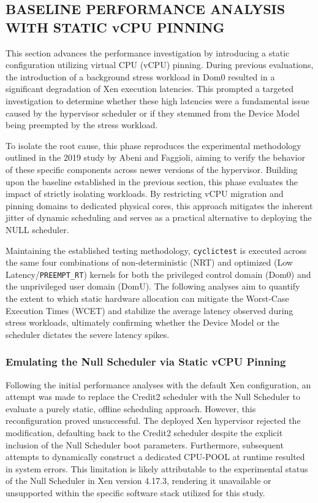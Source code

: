 \subsection{BASELINE PERFORMANCE ANALYSIS WITH STATIC vCPU
PINNING}\label{baseline-performance-analysis-with-static-vcpu-pinning}

This section advances the performance investigation by introducing a
static configuration utilizing virtual CPU (vCPU) pinning. During
previous evaluations, the introduction of a background stress workload
in Dom0 resulted in a significant degradation of Xen execution
latencies. This prompted a targeted investigation to determine whether
these high latencies were a fundamental issue caused by the hypervisor
scheduler or if they stemmed from the Device Model being preempted by
the stress workload.

To isolate the root cause, this phase reproduces the experimental
methodology outlined in the 2019 study by Abeni and Faggioli, aiming to
verify the behavior of these specific components across newer versions
of the hypervisor. Building upon the baseline established in the
previous section, this phase evaluates the impact of strictly isolating
workloads. By restricting vCPU migration and pinning domains to
dedicated physical cores, this approach mitigates the inherent jitter of
dynamic scheduling and serves as a practical alternative to deploying
the NULL scheduler.

Maintaining the established testing methodology, \texttt{cyclictest} is
executed across the same four combinations of non-deterministic (NRT)
and optimized (Low Latency/\texttt{PREEMPT\_RT}) kernels for both the
privileged control domain (Dom0) and the unprivileged user domain
(DomU). The following analyses aim to quantify the extent to which
static hardware allocation can mitigate the Worst-Case Execution Times
(WCET) and stabilize the average latency observed during stress
workloads, ultimately confirming whether the Device Model or the
scheduler dictates the severe latency spikes.

\subsubsection{Emulating the Null Scheduler via Static vCPU
Pinning}\label{emulating-the-null-scheduler-via-static-vcpu-pinning}

Following the initial performance analyses with the default Xen
configuration, an attempt was made to replace the Credit2 scheduler with
the Null Scheduler to evaluate a purely static, offline scheduling
approach. However, this reconfiguration proved unsuccessful. The
deployed Xen hypervisor rejected the modification, defaulting back to
the Credit2 scheduler despite the explicit inclusion of the Null
Scheduler boot parameters. Furthermore, subsequent attempts to
dynamically construct a dedicated CPU-POOL at runtime resulted in system
errors. This limitation is likely attributable to the experimental
status of the Null Scheduler in Xen version 4.17.3, rendering it
unavailable or unsupported within the specific software stack utilized
for this study.

